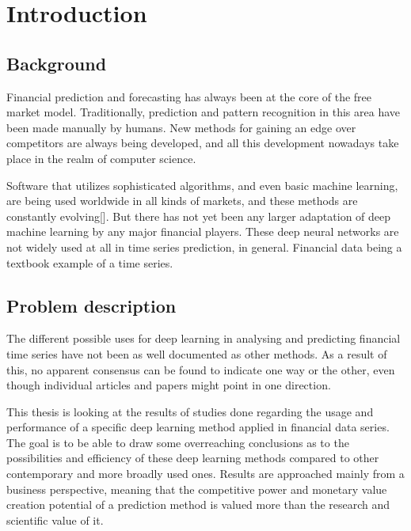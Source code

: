 \section{Introduction}

\subsection{Background}

Financial prediction and forecasting has always been at the core of the free market model. Traditionally, prediction and pattern recognition in this area have been made manually by humans. New methods for gaining an edge over competitors are always being developed, and all this development nowadays take place in the realm of computer science.

Software that utilizes sophisticated algorithms, and even basic machine learning, are being used worldwide in all kinds of markets, and these methods are constantly evolving[]. But there has not yet been any larger adaptation of deep machine learning by any major financial players. These deep neural networks are not widely used at all in time series prediction, in general. Financial data being a textbook example of a time series.


\subsection{Problem description}


The different possible uses for deep learning in analysing and predicting financial time series have not been as well documented as other methods. As a result of this, no apparent consensus can be found to indicate one way or the other, even though individual articles and papers might point in one direction.

This thesis is looking at the results of studies done regarding the usage and performance of a specific deep learning method applied in financial data series. The goal is to be able to draw some overreaching conclusions as to the possibilities and efficiency of these deep learning methods compared to other contemporary and more broadly used ones. Results are approached mainly from a business perspective, meaning that the competitive power and monetary value creation potential of a prediction method is valued more than the research and scientific value of it.



